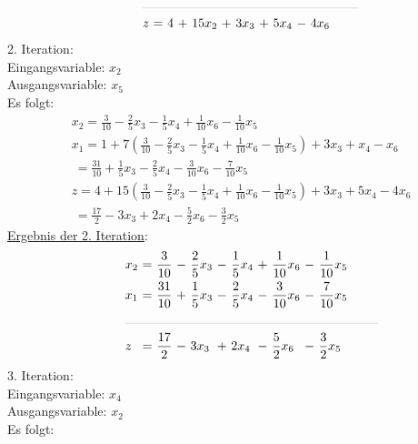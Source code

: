 \documentclass [a4paper,11pt]{article}
\begin{document}
\begin{enumerate}
\begin{align*}
\begin{alignedat}{6}
            &\rlap{\rule{6cm}{.1pt}} &&&&&&&&&&\\
            & z   &\ = &\ 4 &\ + &\ 15x_2 &\ + &\ 3x_3 &\ + &\ 5x_4 &\ - &\ 4x_6
            \end{alignedat}
            \end{align*}
            2. Iteration:\\
            Eingangsvariable: $x_2$\\
            Ausgangsvariable: $x_5$\\
            Es folgt:
            \begin{align*}
            & x_2 = \frac{3}{10} - \frac{2}{5}x_3 - \frac{1}{5}x_4 + \frac{1}{10}x_6 - \frac{1}{10}x_5\\
            & x_1 = 1 + 7 \left( \frac{3}{10} - \frac{2}{5}x_3 - \frac{1}{5}x_4 + \frac{1}{10}x_6 - \frac{1}{10}x_5 \right) + 3x_3 + x_4 - x_6\\
            &   \ = \frac{31}{10} + \frac{1}{5}x_3 - \frac{2}{5}x_4 - \frac{3}{10}x_6 - \frac{7}{10}x_5\\
            &   z = 4 + 15 \left( \frac{3}{10} - \frac{2}{5}x_3 - \frac{1}{5}x_4 + \frac{1}{10}x_6 - \frac{1}{10}x_5 \right) + 3x_3 + 5x_4 - 4x_6\\
            &   \ = \frac{17}{2} - 3x_3 + 2x_4 - \frac{5}{2}x_6 - \frac{3}{2}x_5
            \end{align*}
            \underline{Ergebnis der 2. Iteration}:
            \begin{align*}
            \begin{alignedat}{6}
            & x_2 &\ = &\  \frac{3}{10} &\ - &\ \frac{2}{5}x_3 &\ - &\ \frac{1}{5}x_4 &\ + &\ \frac{1}{10}x_6 &\ - &\ \frac{1}{10}x_5 \\
            & x_1 &\ = &\ \frac{31}{10} &\ + &\ \frac{1}{5}x_3 &\ - &\ \frac{2}{5}x_4 &\ - &\ \frac{3}{10}x_6 &\ - &\ \frac{7}{10}x_5 \\
            &\rlap{\rule{7cm}{.1pt}} &&&&&&&&&&\\
            & z   &\ = &\ \frac{17}{2} &\ - &\           3x_3 &\ + &\           2x_4 &\ - &\  \frac{5}{2}x_6 &\ - &\ \frac{3}{2}x_5
            \end{alignedat}
            \end{align*}
            3. Iteration:\\
            Eingangsvariable: $x_4$\\
            Ausgangsvariable: $x_2$\\
            Es folgt:
            \begin{align*}

\end{align*}
\end{enumerate}
\end{document}
